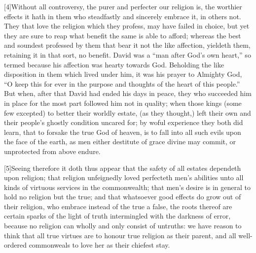 [4]Without all controversy, the purer and perfecter our religion is, the worthier effects it hath in them who steadfastly and sincerely embrace it, in others not. They that love the religion which they profess, may have failed in choice, but yet they are sure to reap what benefit the same is able to afford; whereas the best and soundest professed by them that bear it not the like affection, yieldeth them, retaining it in that sort, no benefit. David was a “man after God’s own heart,” so termed because his affection was hearty towards God. Beholding the like disposition in them which lived under him, it was his prayer to Almighty God, “O keep this for ever in the purpose and thoughts of the heart of this people.” But when, after that David had ended his days in peace, they who succeeded him in place for the most part followed him not in quality; when those kings (some few excepted) to better their worldly estate, (as they thought,) left their own and their people’s ghostly condition uncared for; by woful experience they both did learn, that to forsake the true God of heaven, is to fall into all such evils upon the face of the earth, as men either destitute of grace divine may commit, or unprotected from above endure.

[5]Seeing therefore it doth thus appear that the safety of all estates dependeth upon religion; that religion unfeignedly loved perfecteth men’s abilities unto all kinds of virtuous services in the commonwealth; that men’s desire is in general to  hold no religion but the true;
 and that whatsoever good effects do grow out of their religion, who embrace instead of the true a false, the roots thereof are certain sparks of the light of truth intermingled with the darkness of error, because no religion can wholly and only consist of untruths: we have reason to think that all true virtues are to honour true religion as their parent, and all well-ordered commonweals to love her as their chiefest stay.


